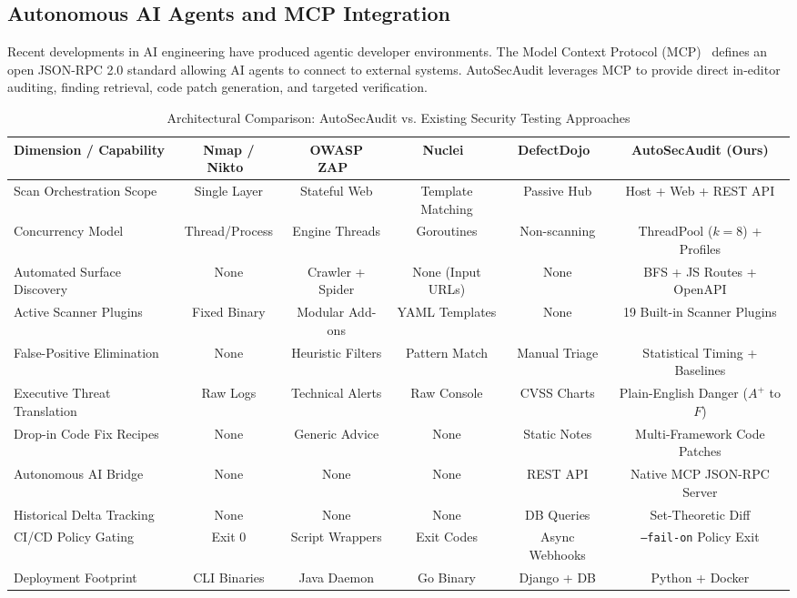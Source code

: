 \documentclass[conference]{IEEEtran}
\begin{document}
\subsection{Autonomous AI Agents and MCP Integration}
Recent developments in AI engineering have produced agentic developer environments. The Model Context Protocol (MCP)~\cite{mcp2024} defines an open JSON-RPC 2.0 standard allowing AI agents to connect to external systems. AutoSecAudit leverages MCP to provide direct in-editor auditing, finding retrieval, code patch generation, and targeted verification.

\begin{table}[t]
\caption{Architectural Comparison: AutoSecAudit vs. Existing Security Testing Approaches}
\label{tab:comparison_framework}
\centering
\renewcommand{\arraystretch}{1.05}
\begin{tabular}{lccccc}
\toprule
\textbf{Dimension / Capability} & \textbf{Nmap / Nikto}~\cite{nmap,nikto} & \textbf{OWASP ZAP}~\cite{owasp_zap} & \textbf{Nuclei}~\cite{nuclei} & \textbf{DefectDojo}~\cite{defectdojo} & \textbf{AutoSecAudit (Ours)} \\
\midrule
Scan Orchestration Scope & Single Layer & Stateful Web & Template Matching & Passive Hub & Host + Web + REST API \\
Concurrency Model & Thread/Process & Engine Threads & Goroutines & Non-scanning & ThreadPool ($k=8$) + Profiles \\
Automated Surface Discovery & None & Crawler + Spider & None (Input URLs) & None & BFS + JS Routes + OpenAPI \\
Active Scanner Plugins & Fixed Binary & Modular Add-ons & YAML Templates & None & 19 Built-in Scanner Plugins \\
False-Positive Elimination & None & Heuristic Filters & Pattern Match & Manual Triage & Statistical Timing + Baselines \\
Executive Threat Translation & Raw Logs & Technical Alerts & Raw Console & CVSS Charts & Plain-English Danger ($A^+$ to $F$) \\
Drop-in Code Fix Recipes & None & Generic Advice & None & Static Notes & Multi-Framework Code Patches \\
Autonomous AI Bridge & None & None & None & REST API & Native MCP JSON-RPC Server \\
Historical Delta Tracking & None & None & None & DB Queries & Set-Theoretic Diff \\
CI/CD Policy Gating & Exit 0 & Script Wrappers & Exit Codes & Async Webhooks & \texttt{--fail-on} Policy Exit \\
Deployment Footprint & CLI Binaries & Java Daemon & Go Binary & Django + DB & Python + Docker \\
\bottomrule
\end{tabular}
\end{table}
\end{document}
